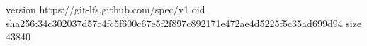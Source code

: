 version https://git-lfs.github.com/spec/v1
oid sha256:34c302037d57c4fc5f600c67e5f2f897c892171e472ae4d5225f5c35ad699d94
size 43840
